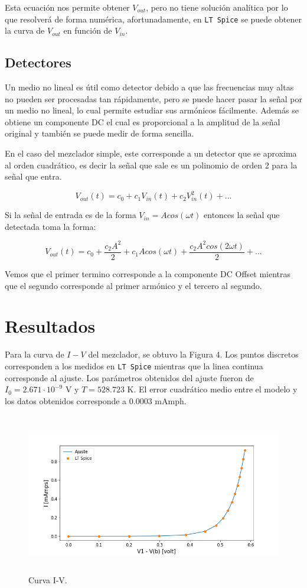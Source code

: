 \documentclass[letterpaper,oneside]{article}
\begin{document}
Esta ecuación nos permite obtener $V_{out}$, pero no tiene solución analítica por lo que resolverá de forma numérica, afortunadamente, en \texttt{LT Spice} se puede obtener la curva de $V_{out}$ en función de $V_{in}$. 

\subsection{Detectores}
Un medio no lineal es útil como detector debido a que las frecuencias muy altas no pueden ser procesadas tan rápidamente, pero se puede hacer pasar la señal por un medio no lineal, lo cual permite estudiar sus armónicos fácilmente. Además se obtiene un componente DC el cual es proporcional a la amplitud de la señal original y también se puede medir de forma sencilla. 

En el caso del mezclador simple, este corresponde a un detector que se aproxima al orden cuadrático, es decir la señal que sale es un polinomio de orden 2 para la señal que entra.

$$V_{out} (t) = c_0 + c_1V_{in}(t) + c_2V_{in}^2(t) + ...$$

Si la señal de entrada es de la forma $V_{in}=Acos(\omega t)$ entonces la señal que detectada toma la forma:

$$V_{out}(t) = c_0 + \frac{c_2 A^2}{2} + c_1 A cos(\omega t) + \frac{c_2 A^2 cos(2 \omega t)}{2} + ...$$

Vemos que el primer termino corresponde a la componente DC Offset mientras que el segundo corresponde al primer armónico y el tercero al segundo.

\section{Resultados}

Para la curva de $I-V$ del mezclador, se obtuvo la Figura 4. Los puntos discretos corresponden a los medidos en \texttt{LT Spice} mientras que la linea continua corresponde al ajuste. Los parámetros obtenidos del ajuste fueron de  $I_0= 2.671 \cdot 10^{-9}$ V y $T = 528.723$ K. El error cuadrático medio entre el modelo y los datos obtenidos corresponde a $0.0003$ mAmph. 

\begin{figure}
  \centering
  \includegraphics[height=7cm]{../graficos/curvaiv.png}
  \caption{Curva I-V.}
\end{figure}
\end{document}
